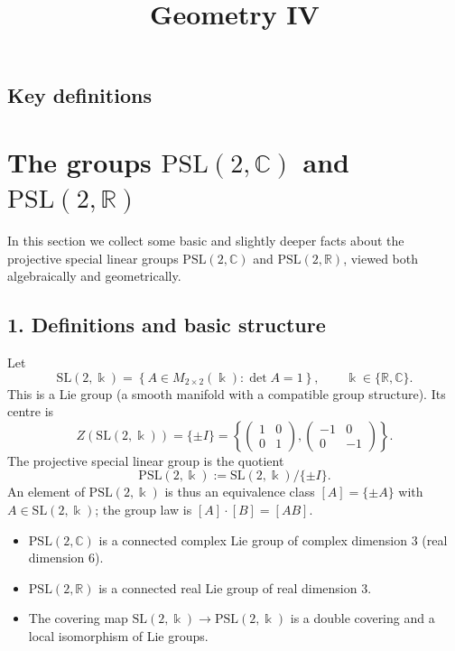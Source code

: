 \documentclass[12pt,a4paper]{article}
\title{Geometry IV}
\author{}
\date{}
\theoremstyle{plain}
\theoremstyle{definition}      %
\begin{document}
	\maketitle
	

\subsection*{Key definitions}

\section*{The groups $\mathrm{PSL}(2,\mathbb{C})$ and $\mathrm{PSL}(2,\mathbb{R})$}

In this section we collect some basic and slightly deeper facts about the
projective special linear groups $\mathrm{PSL}(2,\mathbb{C})$ and
$\mathrm{PSL}(2,\mathbb{R})$, viewed both algebraically and geometrically.

\subsection*{1. Definitions and basic structure}

Let
\[
\mathrm{SL}(2,\Bbbk)
= \left\{
A\in M_{2\times 2}(\Bbbk) : \det A = 1
\right\},
\qquad
\Bbbk\in\{\mathbb{R},\mathbb{C}\}.
\]
This is a Lie group (a smooth manifold with a compatible group structure).
Its centre is
\[
Z(\mathrm{SL}(2,\Bbbk))
= \{\pm I\}
= \left\{
\begin{pmatrix}
	1 & 0\\ 0 & 1
\end{pmatrix},
\begin{pmatrix}
	-1 & 0\\ 0 & -1
\end{pmatrix}
\right\}.
\]
The projective special linear group is the quotient
\[
\mathrm{PSL}(2,\Bbbk)
:= \mathrm{SL}(2,\Bbbk)/\{\pm I\}.
\]
An element of $\mathrm{PSL}(2,\Bbbk)$ is thus an equivalence class
$[A] = \{\pm A\}$ with $A\in\mathrm{SL}(2,\Bbbk)$; the group law is
$[A]\cdot[B] = [AB]$.

\begin{itemize}
	\item $\mathrm{PSL}(2,\mathbb{C})$ is a connected complex Lie group of
	complex dimension $3$ (real dimension $6$).
	\item $\mathrm{PSL}(2,\mathbb{R})$ is a connected real Lie group of real
	dimension $3$.
	\item The covering map
	$\mathrm{SL}(2,\Bbbk)\to\mathrm{PSL}(2,\Bbbk)$ is a double covering
	and a local isomorphism of Lie groups.
\end{itemize}
\end{document}
